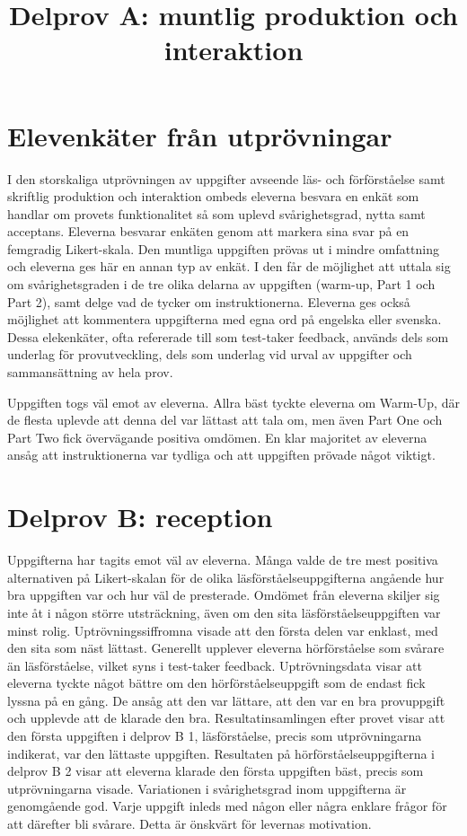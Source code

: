 \section*{Elevenkäter från utprövningar}
I den storskaliga utprövningen av uppgifter avseende läs- och förförståelse samt skriftlig produktion och interaktion ombeds eleverna besvara en enkät som handlar om provets funktionalitet så som uplevd svårighetsgrad, nytta samt acceptans. Eleverna besvarar enkäten genom att markera sina svar på en femgradig Likert-skala. Den muntliga uppgiften prövas ut i mindre omfattning och eleverna ges här en annan typ av enkät. I den får de möjlighet att uttala sig om svårighetsgraden i de tre olika delarna av uppgiften (warm-up, Part 1 och Part 2), samt delge vad de tycker om instruktionerna. Eleverna ges också möjlighet att kommentera uppgifterna med egna ord på engelska eller svenska. Dessa elekenkäter, ofta refererade till som test-taker feedback, används dels som underlag för provutveckling, dels som underlag vid urval av uppgifter och sammansättning av hela prov.

\title{
Delprov A: muntlig produktion och interaktion
}
Uppgiften togs väl emot av eleverna. Allra bäst tyckte eleverna om Warm-Up, där de flesta uplevde att denna del var lättast att tala om, men även Part One och Part Two fick övervägande positiva omdömen. En klar majoritet av eleverna ansåg att instruktionerna var tydliga och att uppgiften prövade något viktigt.
\section*{Delprov B: reception}
Uppgifterna har tagits emot väl av eleverna. Många valde de tre mest positiva alternativen på Likert-skalan för de olika läsförståelseuppgifterna angående hur bra uppgiften var och hur väl de presterade. Omdömet från eleverna skiljer sig inte åt i någon större utsträckning, även om den sita läsförståelseuppgiften var minst rolig. Uptrövningssiffromna visade att den första delen var enklast, med den sita som näst lättast.
Generellt upplever eleverna hörförståelse som svårare än läsförståelse, vilket syns i test-taker feedback. Uptrövningsdata visar att eleverna tyckte något bättre om den hörförståelseuppgift som de endast fick lyssna på en gång. De ansåg att den var lättare, att den var en bra provuppgift och upplevde att de klarade den bra.
Resultatinsamlingen efter provet visar att den första uppgiften i delprov B 1, läsförståelse, precis som utprövningarna indikerat, var den lättaste uppgiften. Resultaten på hörförståelseuppgifterna i delprov B 2 visar att eleverna klarade den första uppgiften bäst, precis som utprövningarna visade. Variationen i svårighetsgrad inom uppgifterna är genomgående god. Varje uppgift inleds med någon eller några enklare frågor för att därefter bli svårare. Detta är önskvärt för levernas motivation.

